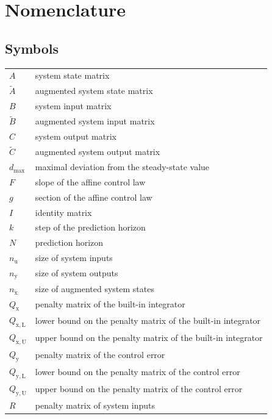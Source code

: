 \documentclass[preprint,12pt]{elsarticle}
\begin{document}
	\section*{Nomenclature}
	
	\subsection*{Symbols}
		\begin{tabular}{ l l }
			$A$ & system state matrix \\
			$\widetilde{A}$ & augmented system state matrix \\
			$B$ & system input matrix \\
			$\widetilde{B}$ & augmented system input matrix \\
			$C$ & system output matrix \\
			$\widetilde{C}$ & augmented system output matrix \\
			$d_{\max}$ & maximal deviation from the steady-state value \\
			$F$ & slope of the affine control law \\
			$g$ & section of the affine control law \\
			$I$ & identity matrix \\
			$k$ & step of the prediction horizon \\
			$N$ & prediction horizon \\
			$n_{\mathrm{u}}$ & size of system inputs \\
			$n_{\mathrm{y}}$ & size of system outputs \\
			$n_{\widetilde{\mathrm{x}}}$ & size of augmented system states \\
			$Q_{\mathrm{x}}$ & penalty matrix of the built-in integrator \\
			$Q_{\mathrm{x,L}}$ & lower bound on the penalty matrix of the built-in integrator \\
			$Q_{\mathrm{x,U}}$ & upper bound on the penalty matrix of the built-in integrator \\
			$Q_{\mathrm{y}}$ & penalty matrix of the control error \\
			$Q_{\mathrm{y,L}}$ & lower bound on the penalty matrix of the control error \\
			$Q_{\mathrm{y,U}}$ & upper bound on the penalty matrix of the control error \\
			$R$ & penalty matrix of system inputs \\

\end{tabular}
\end{document}

